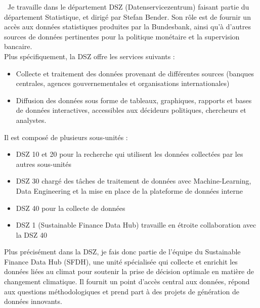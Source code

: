~Je travaille dans le département DSZ (Datenservicezentrum) faisant partie du département Statistique, et dirigé par Stefan Bender. Son rôle est de fournir un accès aux données statistiques produites par la Bundesbank, 
ainsi qu'à d'autres sources de données pertinentes pour la politique monétaire et la supervision bancaire.
\\
Plus spécifiquement, la DSZ offre les services suivants :
\begin{itemize}
    \item Collecte et traitement des données provenant de différentes sources (banques centrales, agences gouvernementales et organisations internationales)
    \item Diffusion des données sous forme de tableaux, graphiques, rapports et bases de données interactives, accessibles aux décideurs politiques, chercheurs et analystes.
\end{itemize}
Il est composé de plusieurs sous-unités : 
\begin{itemize}
    \item DSZ 10 et 20 pour la recherche qui utilisent les données  collectées par les autres sous-unités
    \item DSZ 30 chargé des tâches de traitement de données avec Machine-Learning, Data Engineering et la mise en place de la plateforme de données interne
    \item DSZ 40 pour la collecte de données
    \item DSZ 1 (Sustainable Finance Data Hub) travaille en étroite collaboration avec la DSZ 40
\end{itemize}

Plus précisément dans la DSZ, je fais donc partie de l'équipe du Sustainable Finance Data Hub (SFDH), une unité spécialisée qui collecte et enrichit les données liées au climat pour soutenir la prise de décision optimale en matière de changement climatique. 
Il fournit un point d'accès central aux données, répond aux questions méthodologiques et prend part à des projets de génération de données innovants.






